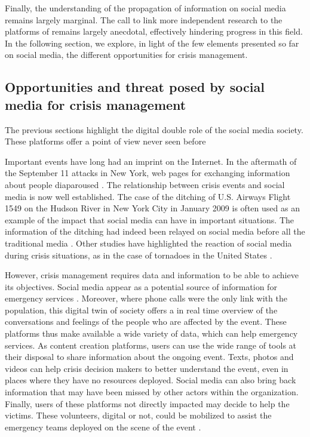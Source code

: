 Finally, the understanding of the propagation of information on social media remains largely marginal.
The call to link more independent research to the platforms of \cite{lazerScienceFakeNews2018} remains largely anecdotal, effectively hindering progress in this field.
In the following section, we explore, in light of the few elements presented so far on social media, the different opportunities for crisis management.

\subsection{Opportunities and threat posed by social media for crisis management}
The previous sections highlight the digital double role of the social media society.
These platforms offer a point of view never seen before

Important events have long had an imprint on the Internet.
In the aftermath of the September 11 attacks in New York, web pages for exchanging information about people diaparoused \cite{palenCitizenCommunicationsCrisis2007}.
The relationship between crisis events and social media is now well established.
The case of the ditching of U.S. Airways Flight 1549 on the Hudson River in New York City in January 2009 is often used as an example of the impact that social media can have in important situations.
The information of the ditching had indeed been relayed on social media before all the traditional media \cite{murthyTwitter2018}.
Other studies have highlighted the reaction of social media during crisis situations, as in the case of tornadoes in the United States \cite{justinei.blanfordTweetingTornadoes2014}.

However, crisis management requires data and information to be able to achieve its objectives.
Social media appear as a potential source of information for emergency services \cite{tapiaSeekingTrustworthyTweet2011a}.
Moreover, where phone calls were the only link with the population, this digital twin of society offers a in real time overview of the conversations and feelings of the people who are affected by the event.
These platforms thus make available a wide variety of data, which can help emergency services.
As content creation platforms, users can use the wide range of tools at their disposal to share information about the ongoing event.
Texts, photos and videos can help crisis decision makers to better understand the event, even in places where they have no resources deployed.
Social media can also bring back information that may have been missed by other actors within the organization.
Finally, users of these platforms not directly impacted may decide to help the victims.
These volunteers, digital or not, could be mobilized to assist the emergency teams deployed on the scene of the event \cite{batardIntegrerContributionsCitoyennes2021}.

